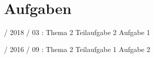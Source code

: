 \documentclass{lehramt-informatik}
\begin{document}

\chapter{Aufgaben}

 / 2018 / 03 : Thema 2 Teilaufgabe 2 Aufgabe 1

%

 / 2016 / 09 : Thema 2 Teilaufgabe 1 Aufgabe 2

\literatur
\end{document}
